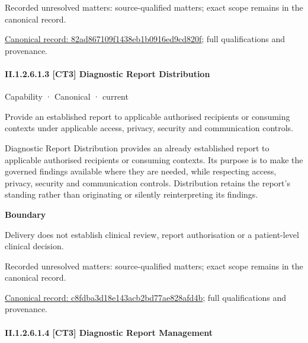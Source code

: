 {\small Recorded unresolved matters: source-qualified matters; exact scope remains in the canonical record.}\par
{\footnotesize \href{../../../../../../../continuum/strategy/capability/82ad867109f1438eb1b0916ed9cd820f.md}{Canonical record: 82ad867109f1438eb1b0916ed9cd820f}; full qualifications and provenance.}\par
\paragraph*{II.1.2.6.1.3 [CT3] Diagnostic Report Distribution}
\label{navigation:II.1.2.6.1.3}

\label{element:c8fdba3d18e143acb2bd77ae828afd4b}
{\small Capability · Canonical · current}\par

Provide an established report to applicable authorised recipients or consuming contexts under applicable access, privacy, security and communication controls.



Diagnostic Report Distribution provides an already established report to applicable authorised recipients or consuming contexts. Its purpose is to make the governed findings available where they are needed, while respecting access, privacy, security and communication controls. Distribution retains the report's standing rather than originating or silently reinterpreting its findings.



\textbf{Boundary}



Delivery does not establish clinical review, report authorisation or a patient-level clinical decision.


{\small Recorded unresolved matters: source-qualified matters; exact scope remains in the canonical record.}\par
{\footnotesize \href{../../../../../../../continuum/strategy/capability/c8fdba3d18e143acb2bd77ae828afd4b.md}{Canonical record: c8fdba3d18e143acb2bd77ae828afd4b}; full qualifications and provenance.}\par
\paragraph*{II.1.2.6.1.4 [CT3] Diagnostic Report Management}
\label{navigation:II.1.2.6.1.4}

